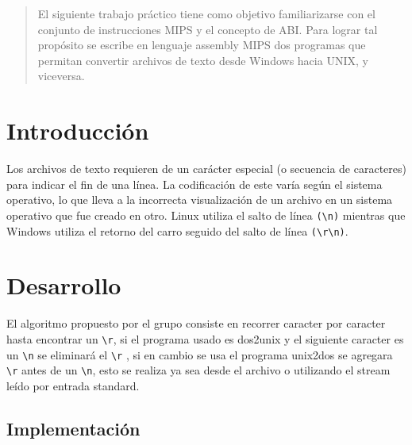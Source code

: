 \documentclass[a4paper]{article}
\begin{document}

\fecha{\today}



\maketitle

\renewcommand{\abstractname}{Resumen} 
\begin{abstract}
El siguiente trabajo práctico tiene como objetivo familiarizarse con el conjunto de instrucciones MIPS y el concepto de ABI. Para lograr tal propósito se escribe en lenguaje assembly MIPS dos programas que permitan convertir archivos de texto desde Windows hacia UNIX, y viceversa.
\end{abstract}


\section{Introducción}
Los archivos de texto requieren de un carácter especial (o secuencia de caracteres) para indicar el fin de una línea. La codificación de este varía según el sistema operativo, lo que lleva a la incorrecta visualización de un archivo en un sistema operativo que fue creado en otro. Linux utiliza el salto de línea \verb|(\n)| mientras que Windows utiliza el retorno del carro seguido del salto de línea \verb|(\r\n)|.

\section{Desarrollo}

El algoritmo propuesto por el grupo consiste en recorrer caracter por caracter hasta encontrar un \verb|\r|, si el programa usado es dos2unix y el siguiente caracter es un \verb|\n| se eliminará el \verb|\r| , si en cambio se usa el programa unix2dos se agregara \verb|\r| antes de un \verb|\n|, esto se realiza ya sea desde el archivo o utilizando el stream leído por entrada standard.

\subsection{Implementación}
\end{document}
